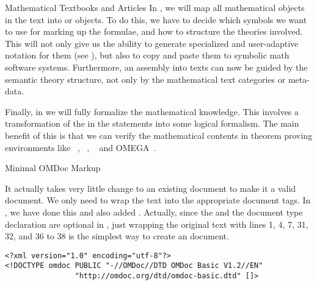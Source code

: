 \begin{tchapter}[id=algebra,short=Textbooks and Articles]{Mathematical Textbooks and Articles}
In {}, we will map all mathematical objects in the text into
{\openmath} or {\cmathml} objects. To do this, we have to decide which
symbols we want to use for marking up the formulae, and how to structure the
theories involved. This will not only give us the ability to generate specialized
and user-adaptive notation for them (see {}), but also to
copy and paste them to symbolic math software systems. Furthermore, an assembly
into texts can now be guided by the semantic theory structure, not only by the
mathematical text categories or meta-data.
   
Finally, in {} we will fully formalize the mathematical
knowledge. This involves a transformation of the
{} in the statements into some logical
formalism. The main benefit of this is that we can verify the mathematical
contents in theorem proving environments like {\nuprl}~\cite{Constable86},
{\hol}~\cite{GoMe93}, {\mizar}~\cite{Rudnicki:aomp92} and
OMEGA~\cite{BenzmuellerEtAl:otama97}.

\begin{tsection}[id=minimal-omdoc]{Minimal OMDoc Markup}

  It actually takes very little change to an existing document to make it a valid {\omdoc}
  document. We only need to wrap the text into the appropriate {\xml} document tags. In
  {}, we have done this and also added
  {}. Actually, since the {} and the document type
  declaration are optional in {\omdoc}, just wrapping the original text with lines 1, 4,
  7, 31, 32, and 36 to 38 is the simplest way to create an {\omdoc}
  document.\medskip
\begin{lstlisting}[label=lst:outerpart,mathescape,
    caption={The outer part of the document},
    index={DOCTYPE,omdoc,metadata,dc:title,dc:creator,dc:date,dc:description,dc:source,
           dc:type,dc:format,theory,omtext,CMP}]
<?xml version="1.0" encoding="utf-8"?>
<!DOCTYPE omdoc PUBLIC "-//OMDoc//DTD OMDoc Basic V1.2//EN"
                "http://omdoc.org/dtd/omdoc-basic.dtd" []>


\end{lstlisting}
\end{tsection}
\end{tchapter}
